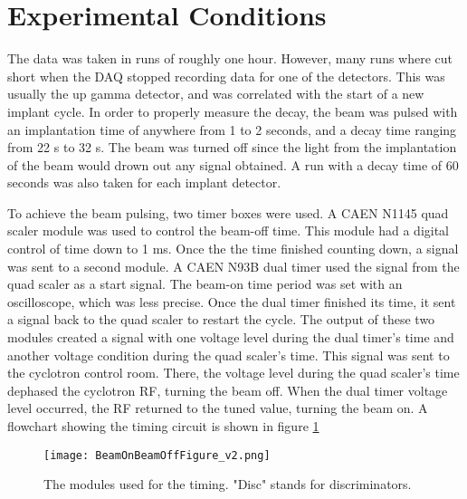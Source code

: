 \documentclass[../MaxHughesThesis.tex]{subfiles}
\begin{document}
\section{Experimental Conditions}
The data was taken in runs of roughly one hour. 
However, many runs where cut short when the DAQ stopped recording data for one of the detectors.
This was usually the up gamma detector, and was correlated with the start of a new implant cycle.
In order to properly measure the decay, the beam was pulsed with an implantation time of anywhere from 1 to 2 seconds, and a decay time ranging from 22 s to 32 s. 
The beam was turned off since the light from the implantation of the beam would drown out any signal obtained. 
A run with a decay time of 60 seconds was also taken for each implant detector. 

To achieve the beam pulsing, two timer boxes were used.
A CAEN N1145 quad scaler module was used to control the beam-off time.
This module had a digital control of time down to 1 ms.
Once the the time finished counting down, a signal was sent to a second module. 
A CAEN N93B dual timer used the signal from the quad scaler as a start signal.
The beam-on time period was set with an oscilloscope, which was less precise. 
Once the dual timer finished its time, it sent a signal back to the quad scaler to restart the cycle.
The output of these two modules created a signal with one voltage level during the dual timer's time and another voltage condition during the quad scaler's time.
This signal was sent to the cyclotron control room.
There, the voltage level during the quad scaler's time dephased the cyclotron RF, turning the beam off.
When the dual timer voltage level occurred, the RF returned to the tuned value, turning the beam on.  
A flowchart showing the timing circuit is shown in figure \ref{fig:TimingFig} 
\begin{figure}
	\centerline{\texttt{[image: BeamOnBeamOffFigure\_v2.png]}}
	\caption{The modules used for the timing.
		 "Disc" stands for discriminators.
		 }
	\label{fig:TimingFig}
\end{figure}
\end{document}
